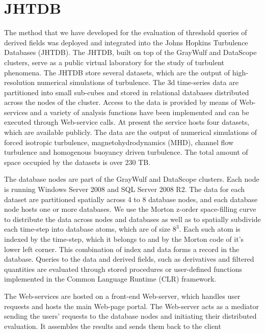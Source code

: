 \documentclass{sig-alternate}
\begin{document}
\section{JHTDB}
The method that we have developed for the evaluation of threshold queries of derived fields was deployed and integrated into the 
Johns Hopkins Turbulence Databases (JHTDB). The JHTDB, built on top of the GrayWulf and DataScope clusters, serve as a public virtual laboratory for
the study of turbulent phenomena. The JHTDB store several datasets, which are the output of high-resolution numerical simulations of turbulence.
The 3d time-series data are partitioned into small sub-cubes and stored in relational databases distributed across the nodes of the cluster.
Access to the data is provided by means of Web-services and a variety of analysis functions have been
implemented and can be executed through Web-service calls.
At present the service hosts four datasets, which are available publicly. 
The data are the output of numerical simulations of forced isotropic turbulence, magnetohydrodynamics (MHD), channel 
flow turbulence and homogenous buoyancy driven turbulence.
The total amount of space occupied by the datasets is over 230 TB. 

The database nodes are part of the GrayWulf \cite{Szalay} and DataScope \cite{TODO} clusters. Each node
is running Windows Server 2008 and SQL Server 2008 R2. The data for each dataset are partitioned spatially across 4 to 8
database nodes, and each database node hosts one or more databases. We use the Morton z-order space-filling
curve to distribute the data across nodes and databases as well as to spatially subdivide each time-step
into database atoms, which are of size $8^3$. Each such atom is indexed by the time-step, which it belongs to and
by the Morton code of it's lower left corner. This combination of index and data forms a record in the database.
Queries to the data and derived fields, such as derivatives and filtered quantities are evaluated through
stored procedures or user-defined functions implemented in the Common Language Runtime (CLR) framework.

The Web-services are hosted on a front-end Web-server, which handles user requests and hosts the main Web-page portal.
The Web-server acts as a mediator sending the users' requests to the database nodes and initiating their distributed evaluation. 
It assembles the results and sends them back to the client
\end{document}
